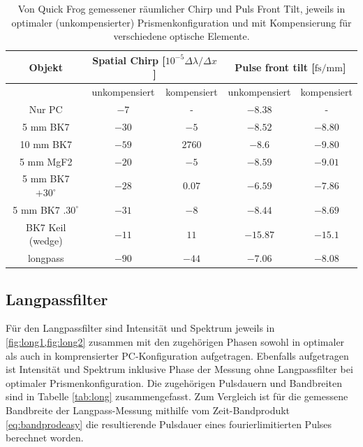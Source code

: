 \documentclass[twoside,        %
               BCOR12mm,       %
               english,ngerman, %
               fleqn,headsepline=false,footsepline=false
              ]{Vorlage/MFPREPORT}
\begin{document}
\begin{table}
    \centering
    \begin{tabular}[]{|c||c|c||c|c|}
        \hline
        Objekt&\multicolumn{2}{|c||}{Spatial Chirp [$10^{-5}\Delta\lambda/\Delta x$]}&\multicolumn{2}{|c|}{Pulse front tilt [$\text{fs}/\text{mm}$]}\\\hline
         &unkompensiert&kompensiert&unkompensiert&kompensiert\\ 
        \hline
        Nur PC&$-7$&-&$-8.38$&-\\\hline
        5 mm BK7&$-30$&$-5$&$-8.52$&$-8.80$\\\hline
        10 mm BK7&$-59$&$2760$&$-8.6$&$-9.80$\\\hline
        5 mm MgF2&$-20$&$-5$&$-8.59$&$-9.01$\\\hline
        5 mm BK7 $+30^\circ$&$-28$&$0.07$&$-6.59$&$-7.86$\\\hline
        5 mm BK7 $.30^\circ$&$-31$&$-8$&$-8.44$&$-8.69$\\\hline
        BK7 Keil (wedge)&$-11$&$11$&$-15.87$&$-15.1$\\\hline
        longpass&$-90$&$-44$&$-7.06$&$-8.08$\\\hline
    \end{tabular}
    \caption{Von Quick Frog gemessener räumlicher Chirp und Puls Front Tilt,
    jeweils in optimaler (unkompensierter) Prismenkonfiguration und mit
    Kompensierung für verschiedene optische Elemente.}
    \label{tab:pft}
\end{table}
\subsection{Langpassfilter}
Für den Langpassfilter sind Intensität und Spektrum jeweils in
\cref{fig:long1,fig:long2} zusammen mit den zugehörigen Phasen sowohl in
optimaler als auch in komprensierter PC-Konfiguration aufgetragen.
Ebenfalls aufgetragen ist Intensität und Spektrum inklusive Phase der Messung
ohne Langpassfilter bei optimaler Prismenkonfiguration. Die zugehörigen
Pulsdauern und Bandbreiten sind in Tabelle \cref{tab:long} zusammengefasst.
Zum Vergleich ist für die gemessene Bandbreite der Langpass-Messung mithilfe
vom Zeit-Bandprodukt \cref{eq:bandprodeasy} die resultierende Pulsdauer eines
fourierlimitierten Pulses berechnet worden.
\end{document}
